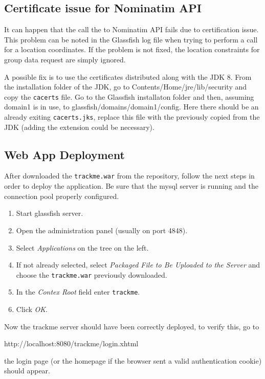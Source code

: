 \subsection{Certificate issue for Nominatim API}
It can happen that the call the to Nominatim API fails due to certification issue.
This problem can be noted in the Glassfish log file when trying to perform a call for a location coordinates.
If the problem is not fixed, the location constraints for group data request are simply ignored.
\vspace{1em}

\noindent
A possible fix is to use the certificates distributed along with the JDK 8.
From the installation folder of the JDK, go to Contents/Home/jre/lib/security and copy the \texttt{cacerts} file.
Go to the Glassfish installaton folder and then, assuming domain1 is in use, to glassfish/domains/domain1/config.
Here there should be an already exiting \texttt{cacerts.jks}, replace this file with the previously copied from the JDK (adding the extension could be necessary).




\subsection{Web App Deployment}
After downloaded the \texttt{trackme.war} from the repository, follow the next steps in order to deploy the application. Be sure that the mysql server is running and the connection pool properly configured.

\begin{enumerate}
\item Start glassfish server.
\item Open the administration panel (usually on port 4848).
\item Select \textit{Applications} on the tree on the left.
\item If not already selected, select \textit{Packaged File to Be Uploaded to the Server} and choose the \texttt{trackme.war} previously downloaded.
\item In the \textit{Contex Root} field enter \texttt{trackme}.
\item Click \textit{OK}.
\end{enumerate}
Now the trackme server should have been correctly deployed, to verify this, go to
\begin{center} http://localhost:8080/trackme/login.xhtml\end{center}
the login page (or the homepage if the browser sent a valid authentication cookie) should appear.

